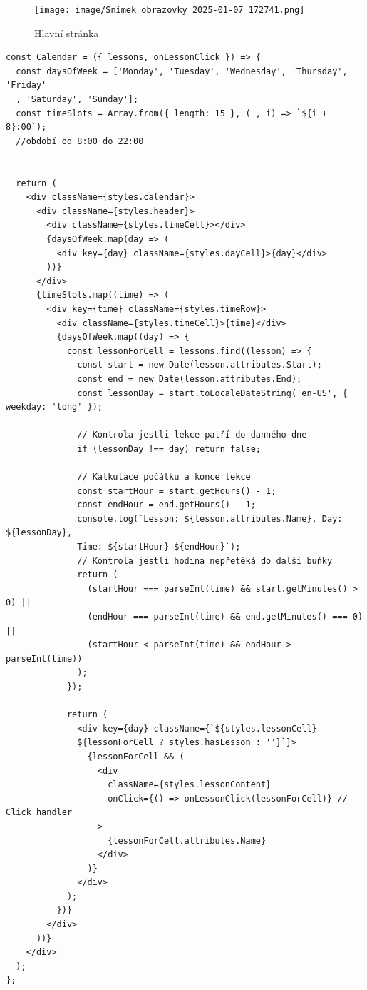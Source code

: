 \documentclass[12pt, a4paper,
openright
]{report}
\begin{document}
	        \begin{figure}[h]
	            \centering
	            \texttt{[image: image/Snímek obrazovky 2025-01-07 172741.png]}
	            \caption{Hlavní stránka}
	            \label{fig:enter-label}
	        \end{figure}
	    	    
    \begin{lstlisting}[style=Python, caption={Ukázka řešení kalendáře}, basicstyle=\footnotesize\ttfamily]
	const Calendar = ({ lessons, onLessonClick }) => {
  const daysOfWeek = ['Monday', 'Tuesday', 'Wednesday', 'Thursday', 'Friday'
  , 'Saturday', 'Sunday'];
  const timeSlots = Array.from({ length: 15 }, (_, i) => `${i + 8}:00`); 
  //období od 8:00 do 22:00


  return (
    <div className={styles.calendar}>
      <div className={styles.header}>
        <div className={styles.timeCell}></div>
        {daysOfWeek.map(day => (
          <div key={day} className={styles.dayCell}>{day}</div>
        ))}
      </div>
      {timeSlots.map((time) => (
        <div key={time} className={styles.timeRow}>
          <div className={styles.timeCell}>{time}</div>
          {daysOfWeek.map((day) => {
            const lessonForCell = lessons.find((lesson) => {
              const start = new Date(lesson.attributes.Start);
              const end = new Date(lesson.attributes.End);
              const lessonDay = start.toLocaleDateString('en-US', { weekday: 'long' });

              // Kontrola jestli lekce patří do danného dne
              if (lessonDay !== day) return false;

              // Kalkulace počátku a konce lekce
              const startHour = start.getHours() - 1;
              const endHour = end.getHours() - 1;
              console.log(`Lesson: ${lesson.attributes.Name}, Day: ${lessonDay}, 
              Time: ${startHour}-${endHour}`);
              // Kontrola jestli hodina nepřetéká do další buňky
              return (
                (startHour === parseInt(time) && start.getMinutes() > 0) ||
                (endHour === parseInt(time) && end.getMinutes() === 0) ||
                (startHour < parseInt(time) && endHour > parseInt(time))
              );
            });

            return (
              <div key={day} className={`${styles.lessonCell} 
              ${lessonForCell ? styles.hasLesson : ''}`}>
                {lessonForCell && (
                  <div
                    className={styles.lessonContent}
                    onClick={() => onLessonClick(lessonForCell)} // Click handler
                  >
                    {lessonForCell.attributes.Name}
                  </div>
                )}
              </div>
            );
          })}
        </div>
      ))}
    </div>
  );
};
\end{lstlisting}
\clearpage
\end{document}
